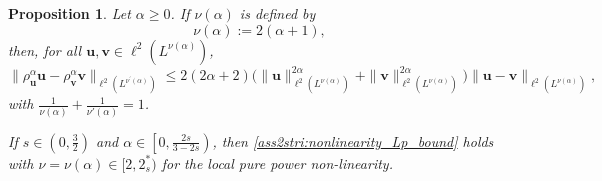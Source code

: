 \documentclass[12pt,a4paper]{amsart}
\newtheorem{prop}[theorem]{Proposition}
\numberwithin{equation}{section}
\newcommand{\ulu}{\boldsymbol{u}}
\newcommand{\ulv}{\boldsymbol{v}}
\newcommand{\twoasts}{{2^*_s}}
\begin{document}
	\begin{prop}\label{lem:power_nonlinear_estimates}
		Let $\alpha\geq 0$. If $ \nu(\alpha)$ %
		is defined by 
		\begin{equation}\label{eq:nu(alpha)}
			\nu(\alpha) := 2(\alpha+1), %
		\end{equation}
		then, for all $ \ulu,\ulv\in\ell^2(L^{\nu(\alpha)}) $, 
		\begin{equation}
			\label{est:power_Lp}
			\big\| \rho_{\ulu}^\alpha \ulu - \rho_{\ulv}^\alpha \ulv \big\|_{\ell^2(L^{\nu^\prime(\alpha)})} \leq 2(2\alpha+2)  \big( \| \ulu \|_{\ell^2(L^{\nu(\alpha)})}^{2\alpha} + \| \ulv \|_{\ell^2(L^{\nu(\alpha)})}^{2\alpha} \big) \| \ulu-\ulv \|_{\ell^2(L^{\nu(\alpha)})} ,
		\end{equation}	
		with $\frac{1}{\nu(\alpha)}+\frac{1}{\nu'(\alpha)}=1$.
		
		If $s\in(0,\frac32)$ and $ \alpha \in \left[ 0, \frac{2s}{3-2s} \right) $, then  \ref{ass2stri:nonlinearity_Lp_bound} holds with $\nu=\nu(\alpha)\in[2,\twoasts)$ for the local pure power non-linearity.
	\end{prop}
\end{document}
